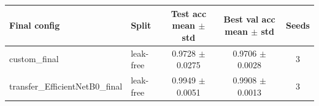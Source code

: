 \begin{tabular}{llccc}
\toprule
Final config & Split & Test acc mean $\pm$ std & Best val acc mean $\pm$ std & Seeds \\
\midrule
custom\_final & leak-free & 0.9728 $\pm$ 0.0275 & 0.9706 $\pm$ 0.0028 & 3\\
transfer\_EfficientNetB0\_final & leak-free & 0.9949 $\pm$ 0.0051 & 0.9908 $\pm$ 0.0013 & 3 \\
\bottomrule
\end{tabular}
